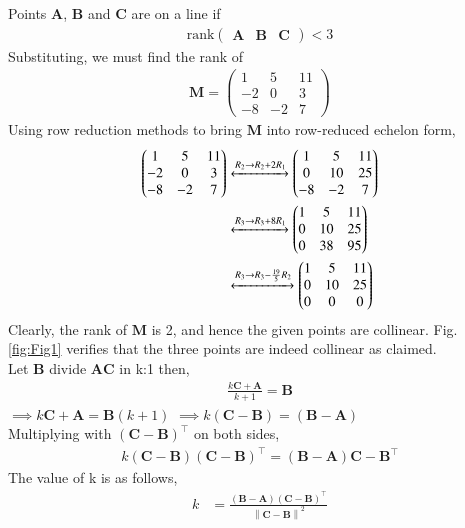 \documentclass[12pt]{article}
\let\vec\mathbf
\providecommand{\brak}[1]{\ensuremath{\left(#1\right)}}
\providecommand{\norm}[1]{\left\lVert#1\right\rVert}
\newcommand{\myvec}[1]{\ensuremath{\begin{pmatrix}#1\end{pmatrix}}}
\let\vec\mathbf
\begin{document}
\begin{enumerate}
		Points $\vec{A}$, $\vec{B}$ and $\vec{C}$ are on a line if
    \begin{align}
        \textrm{rank}\myvec{\vec{A} & \vec{B} & \vec{C}} < 3
        \label{eq:chapters/12/10/5/8rank-collinear}
    \end{align}
    Substituting, we must find the rank of
    \begin{align}
        \vec{M} = \myvec{1&5&11\\-2&0&3\\-8&-2&7}
    \end{align}
    Using row reduction methods to bring $\vec{M}$ into row-reduced echelon form,
    \begin{align}
        \myvec{1&5&11\\-2&0&3\\-8&-2&7}&\xleftrightarrow[]{R_2\rightarrow R_2+2R_1}
        \myvec{1&5&11\\0&10&25\\-8&-2&7} \\
                &\xleftrightarrow[]{R_3\rightarrow R_3+8R_1}\myvec{1&5&11\\0&10&25\\0&38&95} \\
                &\xleftrightarrow[]{R_3\rightarrow R_3-\frac{19}{5}R_2}\myvec{1&5&11\\0&10&25\\0&0&0}
                \label{eq:chapters/12/10/5/8row-red}
    \end{align}
    Clearly, the rank of $\vec{M}$ is 2, and hence the given points are 
    collinear. 
    Fig. \ref{fig:Fig1}  verifies that the three points are indeed 
    collinear as claimed.\\
	Let $\vec{B}$ divide $\vec{AC}$ in k:1 then,
	\begin{align}
		\frac{k\vec{C}+\vec{A}}{k+1} = \vec{B}
	\end{align}
		$\implies k\vec{C}+\vec{A}=\vec{B}\brak{k+1}$
		$\implies k\brak{\vec{C}-\vec{B}}=\brak{\vec{B}-\vec{A}}$\\ 
		Multiplying with $\brak{\vec{C}-\vec{B}}^{\top}$ on both sides,
		\begin{align*}
			 k\brak{\vec{C}-\vec{B}}\brak{\vec{C}-\vec{B}}^{\top}=\brak{\vec{B}-\vec{A}}{\vec{C}-\vec{B}}^{\top}
		\end{align*}
			The value of k is as follows,
			\begin{align}
			k &=
			\frac{\brak{\vec{B}-\vec{A}}\brak{\vec{C}-\vec{B}}^{\top}}{\norm{\vec{C-B}}^2}
			\label{eq:7}
			\end{align}


\end{enumerate}
\end{document}
